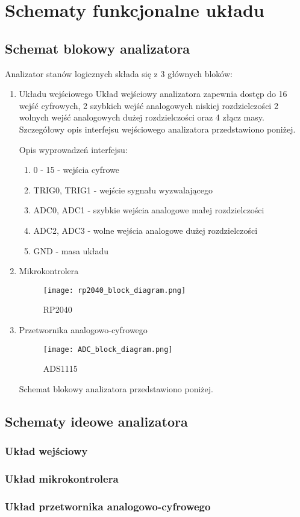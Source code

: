 \section{Schematy funkcjonalne układu}

\subsection{Schemat blokowy analizatora}
Analizator stanów logicznych składa się z 3 głównych bloków:
\begin{enumerate}
    \item Układu wejściowego
Układ wejściowy analizatora zapewnia dostęp do 16 wejść cyfrowych,
2 szybkich wejść analogowych niskiej rozdzielczości 2 wolnych wejść
analogowych dużej rozdzielczości oraz 4 złącz masy. Szczegółowy opis 
interfejsu wejściowego analizatora przedstawiono poniżej.


Opis wyprowadzeń interfejsu:
\begin{enumerate}
    \item 0 - 15 - wejścia cyfrowe
    \item TRIG0, TRIG1 - wejście sygnału wyzwalającego
    \item ADC0, ADC1 - szybkie wejścia analogowe małej rozdzielczości
    \item ADC2, ADC3 - wolne wejścia analogowe dużej rozdzielczości
    \item GND - masa układu 
\end{enumerate} 

    \item Mikrokontrolera
    \begin{figure}[!ht]
        \centering
        \texttt{[image: rp2040\_block\_diagram.png]}
        \caption{RP2040}
        \label{fig:RP2040}
    \end{figure}

    \item Przetwornika analogowo-cyfrowego 
    \begin{figure}[!ht]
        \centering
        \texttt{[image: ADC\_block\_diagram.png]}
        \caption{ADS1115}
        \label{fig:ADS1115}
    \end{figure}

Schemat blokowy analizatora przedstawiono poniżej.
\end{enumerate}



\subsection{Schematy ideowe analizatora}
\subsubsection{Układ wejściowy}
\subsubsection{Układ mikrokontrolera}
\subsubsection{Układ przetwornika analogowo-cyfrowego}






